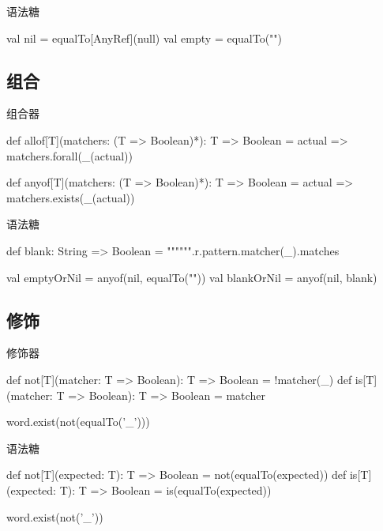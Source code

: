 \begin{frame}[fragile]{语法糖}
  \begin{scala}
val nil   = equalTo[AnyRef](null)
val empty = equalTo("")
  \end{scala}
\end{frame}

\subsection{组合}

\begin{frame}[fragile]{组合器}
  \begin{scala}
def allof[T](matchers: (T => Boolean)*): T => Boolean =
  actual => matchers.forall(_(actual))

def anyof[T](matchers: (T => Boolean)*): T => Boolean =
  actual => matchers.exists(_(actual))
  \end{scala}
\end{frame}

\begin{frame}[fragile]{语法糖}
  \begin{scala}
def blank: String => Boolean = 
  """\s*""".r.pattern.matcher(_).matches

val emptyOrNil = anyof(nil, equalTo(""))
val blankOrNil = anyof(nil, blank)
  \end{scala}
\end{frame}

\subsection{修饰}

\begin{frame}[fragile]{修饰器}
  \begin{scala}
def not[T](matcher: T => Boolean): T => Boolean = !matcher(_)
def is[T](matcher: T => Boolean):  T => Boolean = matcher

word.exist(not(equalTo('_')))
  \end{scala}
\end{frame}

\begin{frame}[fragile]{语法糖}
  \begin{scala}
def not[T](expected: T): T => Boolean = not(equalTo(expected))
def is[T](expected: T):  T => Boolean = is(equalTo(expected))

word.exist(not('_'))
  \end{scala}
\end{frame}

